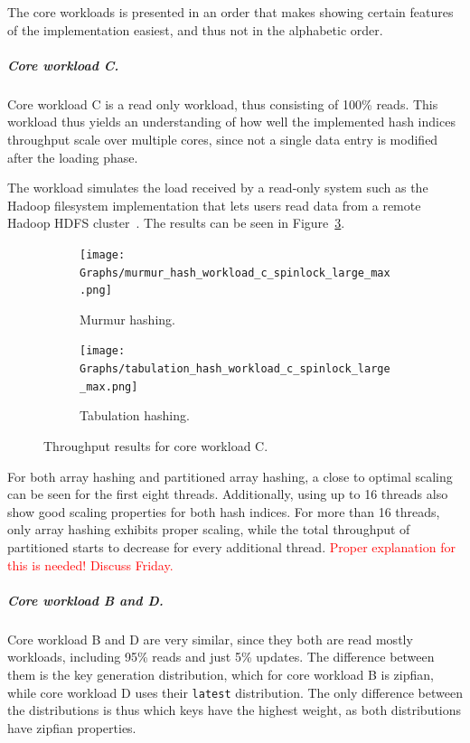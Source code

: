 \documentclass[11pt]{article} %
\begin{document}
The core workloads is presented in an order that makes showing certain features of the implementation easiest, and thus not in the alphabetic order. 

\subparagraph{Core workload C.} Core workload C is a read only workload, thus consisting of 100\% reads. This workload thus yields an understanding of how well the implemented hash indices throughput scale over multiple cores, since not a single data entry is modified after the loading phase. 

The workload simulates the load received by a read-only system such as the Hadoop filesystem implementation that lets users read data from a remote Hadoop HDFS cluster~\cite{HFTP}. The results can be seen in Figure~\ref{fig:res_c}.\\
\begin{figure}[ht]
  \centering
  \begin{subfigure}[b]{0.45\textwidth}
    \texttt{[image: Graphs/murmur\_hash\_workload\_c\_spinlock\_large\_max.png]}
    \caption[]{Murmur hashing.}
    \label{fig:mur_c}
  \end{subfigure} \hfill
  \begin{subfigure}[b]{0.45\textwidth}
    \texttt{[image: Graphs/tabulation\_hash\_workload\_c\_spinlock\_large\_max.png]}
    \caption[]{Tabulation hashing.}
    \label{fig:tab_c}
  \end{subfigure}
  \caption[]{Throughput results for core workload C.}
  \label{fig:res_c}
\end{figure}

For both array hashing and partitioned array hashing, a close to optimal scaling can be seen for the first eight threads. Additionally, using up to 16 threads also show good scaling properties for both hash indices. For more than 16 threads, only array hashing exhibits proper scaling, while the total throughput of partitioned starts to decrease for every additional thread.
\textcolor{red}{Proper explanation for this is needed! Discuss Friday.}
\subparagraph{Core workload B and D.} 
Core workload B and D are very similar, since they both are read mostly workloads, including 95\% reads and just 5\% updates. The difference between them is the key generation distribution, which for core workload B is zipfian, while core workload D uses their \verb|latest| distribution. The only difference between the distributions is thus which keys have the highest weight, as both distributions have zipfian properties.\\
\end{document}
